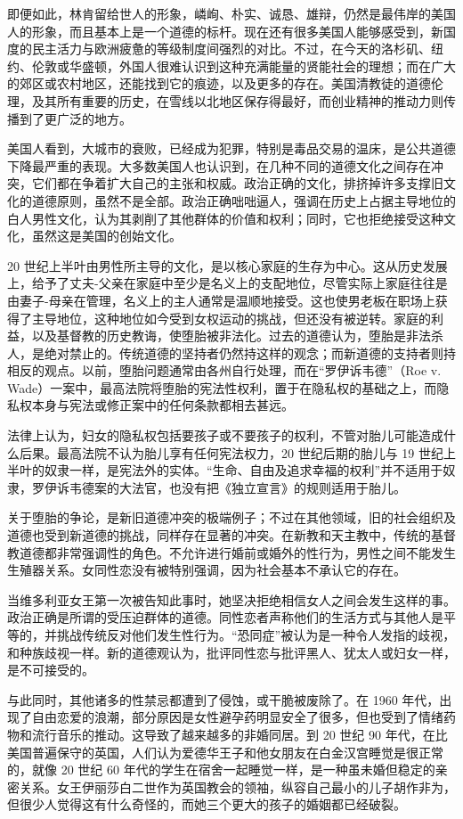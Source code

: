 即便如此，林肯留给世人的形象，嶙峋、朴实、诚恳、雄辩，仍然是最伟岸的美国人的形象，而且基本上是一个道德的标杆。现在还有很多美国人能够感受到，新国度的民主活力与欧洲疲惫的等级制度间强烈的对比。不过，在今天的洛杉矶、纽约、伦敦或华盛顿，外国人很难认识到这种充满能量的贤能社会的理想；而在广大的郊区或农村地区，还能找到它的痕迹，以及更多的存在。美国清教徒的道德伦理，及其所有重要的历史，在雪线以北地区保存得最好，而创业精神的推动力则传播到了更广泛的地方。

美国人看到，大城市的衰败，已经成为犯罪，特别是毒品交易的温床，是公共道德下降最严重的表现。大多数美国人也认识到，在几种不同的道德文化之间存在冲突，它们都在争着扩大自己的主张和权威。政治正确的文化，排挤掉许多支撑旧文化的道德原则，虽然不是全部。政治正确咄咄逼人，强调在历史上占据主导地位的白人男性文化，认为其剥削了其他群体的价值和权利；同时，它也拒绝接受这种文化，虽然这是美国的创始文化。

20 世纪上半叶由男性所主导的文化，是以核心家庭的生存为中心。这从历史发展上，给予了丈夫-父亲在家庭中至少是名义上的支配地位，尽管实际上家庭往往是由妻子-母亲在管理，名义上的主人通常是温顺地接受。这也使男老板在职场上获得了主导地位，这种地位如今受到女权运动的挑战，但还没有被逆转。家庭的利益，以及基督教的历史教诲，使堕胎被非法化。过去的道德认为，堕胎是非法杀人，是绝对禁止的。传统道德的坚持者仍然持这样的观念；而新道德的支持者则持相反的观点。以前，堕胎问题通常由各州自行处理，而在“罗伊诉韦德”（Roe v. Wade）一案中，最高法院将堕胎的宪法性权利，置于在隐私权的基础之上，而隐私权本身与宪法或修正案中的任何条款都相去甚远。

法律上认为，妇女的隐私权包括要孩子或不要孩子的权利，不管对胎儿可能造成什么后果。最高法院不认为胎儿享有任何宪法权力，20 世纪后期的胎儿与 19 世纪上半叶的奴隶一样，是宪法外的实体。“生命、自由及追求幸福的权利”并不适用于奴隶，罗伊诉韦德案的大法官，也没有把《独立宣言》的规则适用于胎儿。

关于堕胎的争论，是新旧道德冲突的极端例子；不过在其他领域，旧的社会组织及道德也受到新道德的挑战，同样存在显著的冲突。在新教和天主教中，传统的基督教道德都非常强调性的角色。不允许进行婚前或婚外的性行为，男性之间不能发生生殖器关系。女同性恋没有被特别强调，因为社会基本不承认它的存在。

当维多利亚女王第一次被告知此事时，她坚决拒绝相信女人之间会发生这样的事。政治正确是所谓的受压迫群体的道德。同性恋者声称他们的生活方式与其他人是平等的，并挑战传统反对他们发生性行为。“恐同症”被认为是一种令人发指的歧视，和种族歧视一样。新的道德观认为，批评同性恋与批评黑人、犹太人或妇女一样，是不可接受的。

与此同时，其他诸多的性禁忌都遭到了侵蚀，或干脆被废除了。在 1960 年代，出现了自由恋爱的浪潮，部分原因是女性避孕药明显安全了很多，但也受到了情绪药物和流行音乐的推动。这导致了越来越多的非婚同居。到 20 世纪 90 年代，在比美国普遍保守的英国，人们认为爱德华王子和他女朋友在白金汉宫睡觉是很正常的，就像 20 世纪 60 年代的学生在宿舍一起睡觉一样，是一种虽未婚但稳定的亲密关系。女王伊丽莎白二世作为英国教会的领袖，纵容自己最小的儿子胡作非为，但很少人觉得这有什么奇怪的，而她三个更大的孩子的婚姻都已经破裂。

